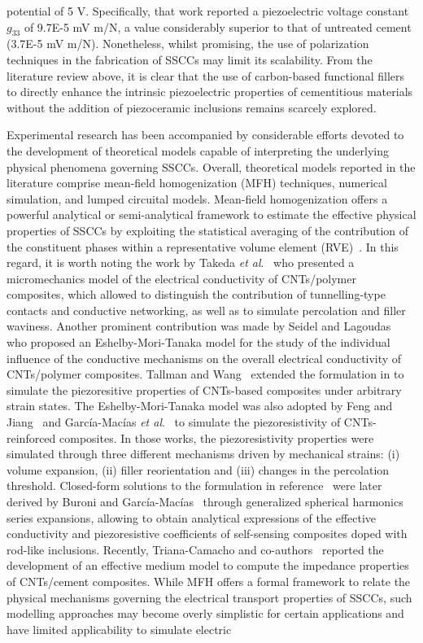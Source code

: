 \documentclass[a4paper,fleqn]{cas-sc}
\begin{document}
potential of 5 V. Specifically, that work reported a piezoelectric voltage constant $g_{33}$ of 9.7E-5 mV m/N, a value considerably superior to that of untreated cement (3.7E-5 mV m/N). Nonetheless, whilst promising, the use of polarization techniques in the fabrication of SSCCs may limit its scalability. From the literature review above, it is clear that the use of carbon-based functional fillers to directly enhance the intrinsic piezoelectric properties of cementitious materials without the addition of piezoceramic inclusions remains scarcely explored.  


Experimental research has been accompanied by considerable efforts devoted to the development of theoretical models capable of interpreting the underlying physical phenomena governing SSCCs. Overall, theoretical models reported in the literature comprise mean-field homogenization (MFH) techniques, numerical simulation, and lumped circuital models. Mean-field homogenization offers a powerful analytical or semi-analytical framework to estimate the effective physical properties of SSCCs by exploiting the statistical averaging of the contribution of the constituent phases within a representative volume element (RVE)~\cite{GarciaMacias2020}. In this regard, it is worth noting the work by Takeda \textit{et al}.~\cite{Takeda2011} who presented a micromechanics model of the electrical conductivity of CNTs/polymer composites, which allowed to distinguish the contribution of tunnelling-type contacts and conductive networking, as well as to simulate percolation and filler waviness. Another prominent contribution was made by Seidel and Lagoudas~\cite{Seidel2009} who proposed an Eshelby-Mori-Tanaka model for the study of the individual influence of the conductive mechanisms on the overall electrical conductivity of CNTs/polymer composites. Tallman and Wang~\cite{Tallman2013} extended the formulation in \cite{Takeda2011} to simulate the piezoresitive properties of CNTs-based composites under arbitrary strain states. The Eshelby-Mori-Tanaka model was also adopted by Feng and Jiang~\cite{Feng2015} and Garc\'{i}a-Mac\'{i}as \textit{et al}.~\cite{microCNTcement,GarciaMacias2018} to simulate the piezoresistivity of CNTs-reinforced composites. In those works, the piezoresistivity properties were simulated through three different mechanisms driven by mechanical strains: (i) volume expansion, (ii) filler reorientation and (iii) changes in the percolation threshold. Closed-form solutions to the formulation in reference~\cite{GarciaMacias2018} were later derived by Buroni and Garc\'{i}a-Mac\'{i}as~\cite{Buroni2021} through generalized spherical harmonics series expansions, allowing to obtain analytical expressions of the effective conductivity and piezoresistive coefficients of self-sensing composites doped with rod-like inclusions. Recently, Triana-Camacho and co-authors~\cite{TrianaCamacho2022} reported the development of an effective medium model to compute the impedance properties of CNTs/cement composites. While MFH offers a formal framework to relate the physical mechanisms governing the electrical transport properties of SSCCs, such modelling approaches may become overly simplistic for certain applications and have limited applicability to simulate electric 
\end{document}
